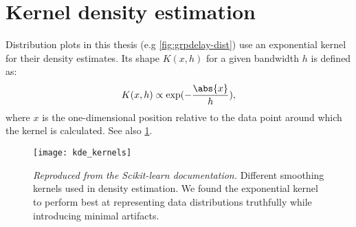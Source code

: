 
\section{Kernel density estimation}
\label{sec:kde-kernels}

Distribution plots in this thesis (e.g \cref{fig:grpdelay-dist}) use an exponential kernel for their density estimates. Its shape $K(x,h)$ for a given bandwidth $h$ is defined as:
\[
K(x,h) \propto \exp(-\frac{\abs{x}}{h}),
\]
where $x$ is the one-dimensional position relative to the data point around which the kernel is calculated. See also \cref{fig:kde-kernels}.

\begin{figure}
\texttt{[image: kde\_kernels]}
\caption
{ \emph{Reproduced from the Scikit-learn documentation.\protect\footnotemark} Different smoothing kernels used in density estimation. We found the exponential kernel to perform best at representing data distributions truthfully while introducing minimal artifacts. }
\label{fig:kde-kernels}
\end{figure}
